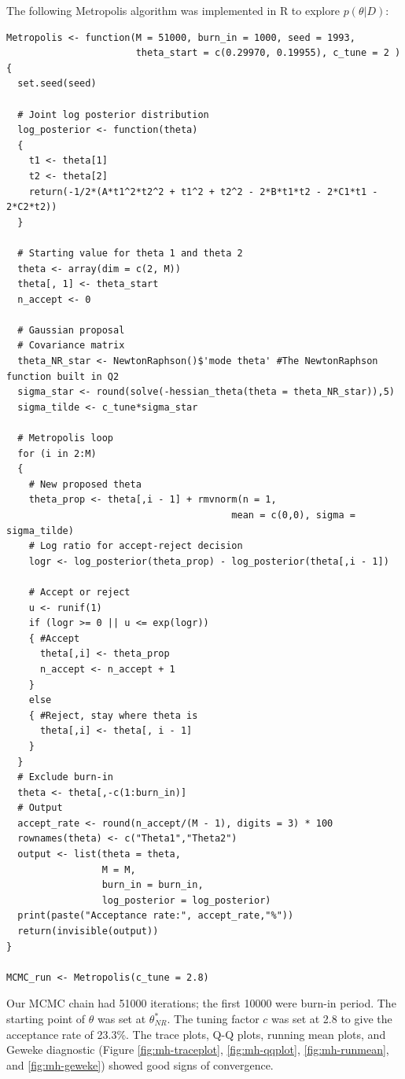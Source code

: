 \documentclass[12pt]{article}
\begin{document}
The following Metropolis algorithm was implemented in R to explore \( p(\theta|D) \):

\begin{lstlisting}
Metropolis <- function(M = 51000, burn_in = 1000, seed = 1993, 
                       theta_start = c(0.29970, 0.19955), c_tune = 2 )
{
  set.seed(seed)
  
  # Joint log posterior distribution
  log_posterior <- function(theta)
  {
    t1 <- theta[1]
    t2 <- theta[2]
    return(-1/2*(A*t1^2*t2^2 + t1^2 + t2^2 - 2*B*t1*t2 - 2*C1*t1 - 2*C2*t2))
  }
  
  # Starting value for theta 1 and theta 2
  theta <- array(dim = c(2, M))
  theta[, 1] <- theta_start
  n_accept <- 0
  
  # Gaussian proposal
  # Covariance matrix
  theta_NR_star <- NewtonRaphson()$'mode theta' #The NewtonRaphson function built in Q2
  sigma_star <- round(solve(-hessian_theta(theta = theta_NR_star)),5)
  sigma_tilde <- c_tune*sigma_star
  
  # Metropolis loop
  for (i in 2:M)
  {
    # New proposed theta
    theta_prop <- theta[,i - 1] + rmvnorm(n = 1, 
                                        mean = c(0,0), sigma = sigma_tilde)
    # Log ratio for accept-reject decision
    logr <- log_posterior(theta_prop) - log_posterior(theta[,i - 1])
    
    # Accept or reject
    u <- runif(1)
    if (logr >= 0 || u <= exp(logr))
    { #Accept
      theta[,i] <- theta_prop
      n_accept <- n_accept + 1
    } 
    else 
    { #Reject, stay where theta is
      theta[,i] <- theta[, i - 1]
    }
  }
  # Exclude burn-in
  theta <- theta[,-c(1:burn_in)]
  # Output
  accept_rate <- round(n_accept/(M - 1), digits = 3) * 100
  rownames(theta) <- c("Theta1","Theta2")
  output <- list(theta = theta,
                 M = M, 
                 burn_in = burn_in,
                 log_posterior = log_posterior)
  print(paste("Acceptance rate:", accept_rate,"%"))
  return(invisible(output))
}

MCMC_run <- Metropolis(c_tune = 2.8)

\end{lstlisting}

Our MCMC chain had 51000 iterations; the first 10000 were burn-in period. The
starting point of \( \theta \) was set at \( \theta^*_{NR} \). The tuning factor \( c \) was set at 2.8 to give the acceptance
rate of 23.3\%. The trace plots, Q-Q plots, running mean plots, and Geweke diagnostic (Figure
\ref{fig:mh-traceplot}, \ref{fig:mh-qqplot}, \ref{fig:mh-runmean}, and \ref{fig:mh-geweke}) showed good signs of convergence.
\end{document}
